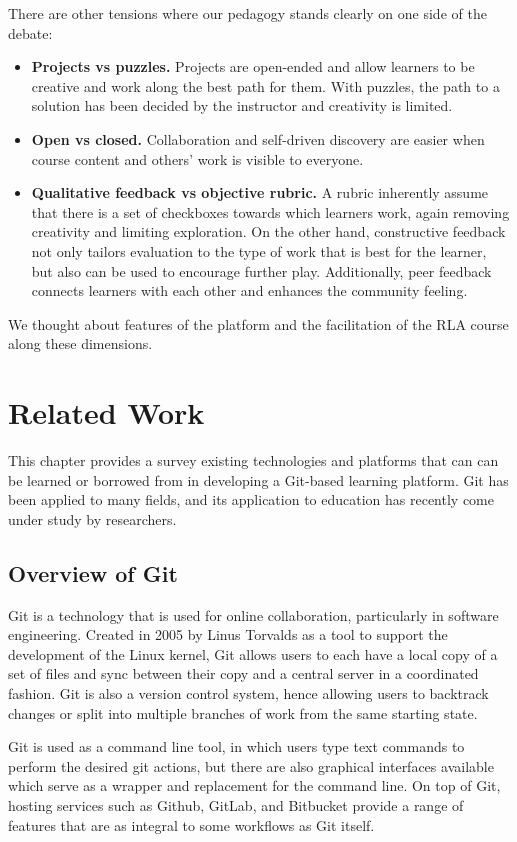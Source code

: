 \documentclass[12pt,twoside]{mitthesis}
\begin{document}
There are other tensions where our pedagogy stands clearly on one side of the debate:
\begin{itemize}
\item \textbf{Projects vs puzzles.} Projects are open-ended and allow learners to be creative and work along the best path for them. With puzzles, the path to a solution has been decided by the instructor and creativity is limited.
\item \textbf{Open vs closed.} Collaboration and self-driven discovery are easier when course content and others' work is visible to everyone.
\item \textbf{Qualitative feedback vs objective rubric.} A rubric inherently assume that there is a set of checkboxes towards which learners work, again removing creativity and limiting exploration. On the other hand, constructive feedback not only tailors evaluation to the type of work that is best for the learner, but also can be used to encourage further play. Additionally, peer feedback connects learners with each other and enhances the community feeling.
\end{itemize}
We thought about features of the platform and the facilitation of the RLA course along these dimensions.

\chapter{Related Work}

This chapter provides a survey existing technologies and platforms that can can be learned or borrowed from in developing a Git-based learning platform. Git has been applied to many fields, and its application to education has recently come under study by researchers.

\section{Overview of Git}

Git is a technology that is used for online collaboration, particularly in software engineering. Created in 2005 by Linus Torvalds as a tool to support the development of the Linux kernel, Git allows users to each have a local copy of a set of files and sync between their copy and a central server in a coordinated fashion. Git is also a version control system, hence allowing users to backtrack changes or split into multiple branches of work from the same starting state.~\cite{githistory}

Git is used as a command line tool, in which users type text commands to perform the desired git actions, but there are also graphical interfaces available which serve as a wrapper and replacement for the command line. On top of Git, hosting services such as Github, GitLab, and Bitbucket provide a range of features that are as integral to some workflows as Git itself.~\cite{githosting}
\end{document}
